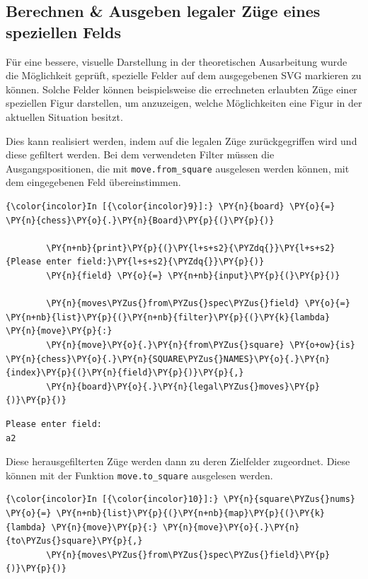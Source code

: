     \subsection{Berechnen \& Ausgeben legaler Züge eines speziellen
Felds}\label{berechnen-ausgeben-legaler-zuxfcge-eines-speziellen-felds}

Für eine bessere, visuelle Darstellung in der theoretischen Ausarbeitung
wurde die Möglichkeit geprüft, spezielle Felder auf dem ausgegebenen SVG
markieren zu können. Solche Felder können beispielsweise die errechneten
erlaubten Züge einer speziellen Figur 
darstellen, um anzuzeigen, welche Möglichkeiten eine Figur in der
aktuellen Situation besitzt.

Dies kann realisiert werden, indem auf die legalen Züge zurückgegriffen
wird und diese gefiltert werden. Bei dem verwendeten Filter müssen die
Ausgangspositionen, die mit \texttt{move.from\_square} ausgelesen werden
können, mit dem eingegebenen Feld übereinstimmen.

    \begin{Verbatim}[commandchars=\\\{\}]
{\color{incolor}In [{\color{incolor}9}]:} \PY{n}{board} \PY{o}{=} \PY{n}{chess}\PY{o}{.}\PY{n}{Board}\PY{p}{(}\PY{p}{)}
        
        \PY{n+nb}{print}\PY{p}{(}\PY{l+s+s2}{\PYZdq{}}\PY{l+s+s2}{Please enter field:}\PY{l+s+s2}{\PYZdq{}}\PY{p}{)}
        \PY{n}{field} \PY{o}{=} \PY{n+nb}{input}\PY{p}{(}\PY{p}{)}
        
        \PY{n}{moves\PYZus{}from\PYZus{}spec\PYZus{}field} \PY{o}{=} \PY{n+nb}{list}\PY{p}{(}\PY{n+nb}{filter}\PY{p}{(}\PY{k}{lambda} \PY{n}{move}\PY{p}{:} 
		\PY{n}{move}\PY{o}{.}\PY{n}{from\PYZus{}square} \PY{o+ow}{is} \PY{n}{chess}\PY{o}{.}\PY{n}{SQUARE\PYZus{}NAMES}\PY{o}{.}\PY{n}{index}\PY{p}{(}\PY{n}{field}\PY{p}{)}\PY{p}{,} 
		\PY{n}{board}\PY{o}{.}\PY{n}{legal\PYZus{}moves}\PY{p}{)}\PY{p}{)}
\end{Verbatim}


    \begin{Verbatim}[commandchars=\\\{\}]
Please enter field:
a2

    \end{Verbatim}

    Diese herausgefilterten Züge werden dann zu deren Zielfelder zugeordnet.
Diese können mit der Funktion \texttt{move.to\_square} ausgelesen werden.

    \begin{Verbatim}[commandchars=\\\{\}]
{\color{incolor}In [{\color{incolor}10}]:} \PY{n}{square\PYZus{}nums} \PY{o}{=} \PY{n+nb}{list}\PY{p}{(}\PY{n+nb}{map}\PY{p}{(}\PY{k}{lambda} \PY{n}{move}\PY{p}{:} \PY{n}{move}\PY{o}{.}\PY{n}{to\PYZus{}square}\PY{p}{,} 
		\PY{n}{moves\PYZus{}from\PYZus{}spec\PYZus{}field}\PY{p}{)}\PY{p}{)}
\end{Verbatim}



